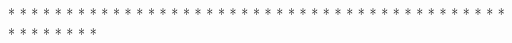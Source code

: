 \documentclass{article}%
\begin{document}
*\newline%
*\newline%
*\newline%
*\newline%
*\newline%
*\newline%
*\newline%
*\newline%
*\newline%
*\newline%
*\newline%
*\newline%
*\newline%
*\newline%
*\newline%
*\newline%
*\newline%
*\newline%
*\newline%
*\newline%
*\newline%
*\newline%
*\newline%
*\newline%
*\newline%
*\newline%
*\newline%
*\newline%
*\newline%
*\newline%
*\newline%
*\newline%
*\newline%
*\newline%
*\newline%
*\newline%
*\newline%
*\newline%
*\newline%
*\newline%
*\newline%
*\newline%
*\newline%
*\newline%
*\newline%
*\newline%
*\newline%
*\newline%
*\newline%
*\newline%
*\newline%
\end{document}
